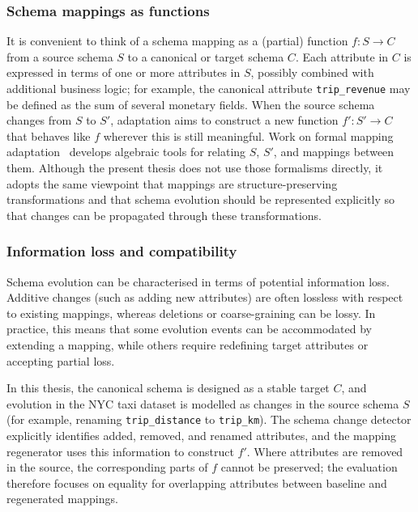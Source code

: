 \subsubsection{Schema mappings as functions}

It is convenient to think of a schema mapping as a (partial) function \(f : S \rightarrow C\) from a source schema \(S\) to a canonical or target schema \(C\). Each attribute in \(C\) is expressed in terms of one or more attributes in \(S\), possibly combined with additional business logic; for example, the canonical attribute \texttt{trip\_revenue} may be defined as the sum of several monetary fields. When the source schema changes from \(S\) to \(S'\), adaptation aims to construct a new function \(f' : S' \rightarrow C\) that behaves like \(f\) wherever this is still meaningful. Work on formal mapping adaptation~\cite{velegrakis2003mapping,yu2005semantic} develops algebraic tools for relating \(S\), \(S'\), and mappings between them. Although the present thesis does not use those formalisms directly, it adopts the same viewpoint that mappings are structure-preserving transformations and that schema evolution should be represented explicitly so that changes can be propagated through these transformations.

\subsubsection{Information loss and compatibility}

Schema evolution can be characterised in terms of potential information loss. Additive changes (such as adding new attributes) are often lossless with respect to existing mappings, whereas deletions or coarse-graining can be lossy. In practice, this means that some evolution events can be accommodated by extending a mapping, while others require redefining target attributes or accepting partial loss.

In this thesis, the canonical schema is designed as a stable target \(C\), and evolution in the NYC taxi dataset is modelled as changes in the source schema \(S\) (for example, renaming \texttt{trip\_distance} to \texttt{trip\_km}). The schema change detector explicitly identifies added, removed, and renamed attributes, and the mapping regenerator uses this information to construct \(f'\). Where attributes are removed in the source, the corresponding parts of \(f\) cannot be preserved; the evaluation therefore focuses on equality for overlapping attributes between baseline and regenerated mappings.

